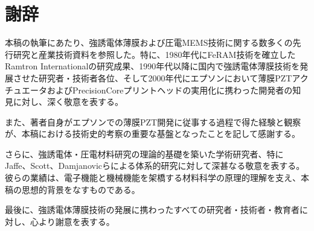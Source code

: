 \documentclass[conference]{IEEEtran}
\begin{document}
\section*{謝辞}
本稿の執筆にあたり、強誘電体薄膜および圧電MEMS技術に関する数多くの先行研究と産業技術資料を参照した。特に、1980年代にFeRAM技術を確立したRamtron Internationalの研究成果、1990年代以降に国内で強誘電体薄膜技術を発展させた研究者・技術者各位、そして2000年代にエプソンにおいて薄膜PZTアクチュエータおよびPrecisionCoreプリントヘッドの実用化に携わった開発者の知見に対し、深く敬意を表する。

また、著者自身がエプソンでの薄膜PZT開発に従事する過程で得た経験と観察が、本稿における技術史的考察の重要な基盤となったことを記して感謝する。

さらに、強誘電体・圧電材料研究の理論的基礎を築いた学術研究者、特にJaffe、Scott、Damjanovicらによる体系的研究に対して深甚なる敬意を表する。彼らの業績は、電子機能と機械機能を架橋する材料科学の原理的理解を支え、本稿の思想的背景をなすものである。

最後に、強誘電体薄膜技術の発展に携わったすべての研究者・技術者・教育者に対し、心より謝意を表する。
\end{document}
